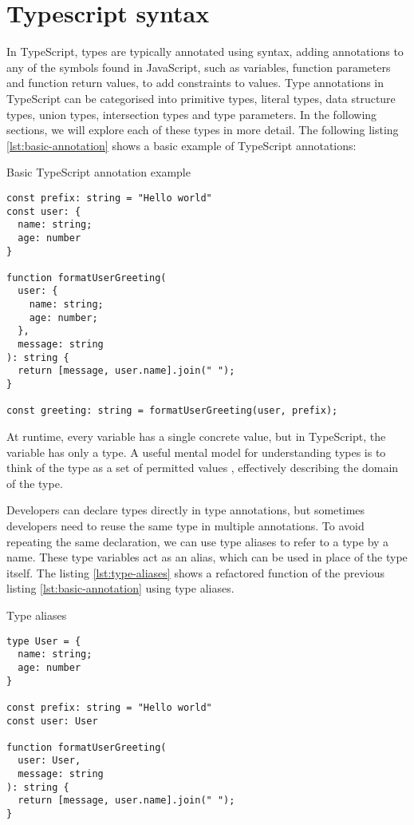 \section{Typescript syntax}

In TypeScript, types are typically annotated using  syntax, adding annotations to any of the symbols found in JavaScript, such as variables, function parameters and function return values, to add constraints to values. Type annotations in TypeScript can be categorised into primitive types, literal types, data structure types, union types, intersection types and type parameters. In the following sections, we will explore each of these types in more detail. The following listing \ref{lst:basic-annotation} shows a basic example of TypeScript annotations:

\begin{listing}[ht]
  \caption{Basic TypeScript annotation example}\label{lst:basic-annotation}
  \begin{verbatim}
const prefix: string = "Hello world"
const user: {
  name: string;
  age: number
}

function formatUserGreeting(
  user: {
    name: string;
    age: number;
  }, 
  message: string
): string {
  return [message, user.name].join(" ");
}

const greeting: string = formatUserGreeting(user, prefix); 
\end{verbatim}
\end{listing}

At runtime, every variable has a single concrete value, but in TypeScript, the variable has only a type. A useful mental model for understanding types is to think of the type as a set of permitted values \cite{vanderkamEffectiveTypeScript622019}, effectively describing the domain of the type.

Developers can declare types directly in type annotations, but sometimes developers need to reuse the same type in multiple annotations. To avoid repeating the same declaration, we can use type aliases to refer to a type by a name. These type variables act as an alias, which can be used in place of the type itself. The listing \ref{lst:type-aliases} shows a refactored  function of the previous listing \ref{lst:basic-annotation} using type aliases.

\begin{listing}[ht]
  \caption{Type aliases}\label{lst:type-aliases}
  \begin{verbatim}
type User = {
  name: string;
  age: number
}

const prefix: string = "Hello world"
const user: User

function formatUserGreeting(
  user: User, 
  message: string
): string {
  return [message, user.name].join(" ");
}
\end{verbatim}
\end{listing}


